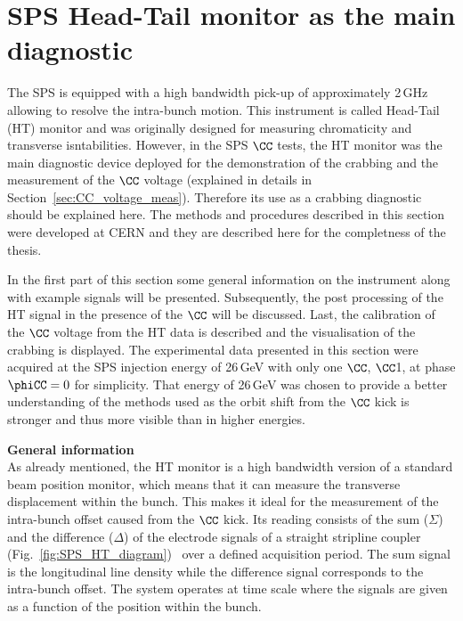\section{SPS Head-Tail monitor as the main diagnostic}\label{sec:HT_info}

The SPS is equipped with a high bandwidth pick-up of approximately 2\,GHz allowing to resolve the intra-bunch motion. This instrument is called Head-Tail (HT) monitor and was originally designed for measuring chromaticity and transverse isntabilities. However, in the SPS $\CC$ tests, the HT monitor was the main diagnostic device deployed for the demonstration of the crabbing and the measurement of the $\CC$ voltage (explained in details in Section~\ref{sec:CC_voltage_meas}). Therefore its use as a crabbing diagnostic should be explained here. The methods and procedures described in this section were developed at CERN and they are described here for the completness of the thesis.

 In the first part of this section some general information on the instrument along with example signals will be presented. Subsequently, the post processing of the HT signal in the presence of the $\CC$ will be discussed. Last, the calibration of the $\CC$ voltage from the HT data is described and the visualisation of the crabbing is displayed. The experimental data presented in this section were acquired at the SPS injection energy of 26\,GeV with only one $\CC$, $\CC$1, at phase $\phiCC=0$ for simplicity. That energy of 26\,GeV was chosen to provide a better understanding of the methods used as the orbit shift from the $\CC$ kick is stronger and thus more visible than in higher energies.


\normalsize{\textbf{General information}}\\
As already mentioned, the HT monitor is a high bandwidth version of a standard beam position monitor, which means that it can measure the transverse displacement within the bunch. This makes it ideal for the measurement of the intra-bunch offset caused from the $\CC$ kick. Its reading consists of the sum ($\Sigma$) and the  difference ($\Delta$) of the electrode signals of a straight stripline coupler (Fig.~\ref{fig:SPS_HT_diagram})~\cite{Jones:987561, Levens:2313358} over a defined acquisition period. The sum signal is the longitudinal line density while the difference signal corresponds to the intra-bunch offset. The system operates at time scale where the signals are given as a function of the position within the bunch.

